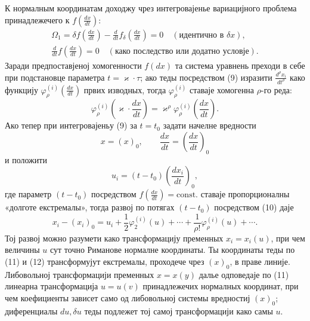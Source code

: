 ﻿\documentclass[11pt]{article}
\begin{document}
К нормалным координатам доходжу чрез интегровајенье вариацијного проблема принадлежечего к \(f\!\left(\frac{dx}{dt}\right)\):
\begin{equation}
\begin{gathered}
\Omega_1=\delta f\!\left(\frac{dx}{dt}\right)
-\frac{d}{dt}f_\delta\!\left(\frac{dx}{dt}\right)=0
\quad(\text{идентично в }\delta x),\\
\frac{d}{dt}f\!\left(\frac{dx}{dt}\right)=0
\quad(\text{како последство или додатно условје}).
\end{gathered}
\tag{9}
\end{equation}
Заради предпоставјеној хомогенности \(f(dx)\) та система уравнень преходи в себе при подстановце параметра \(t=\varkappa\cdot\tau\); ако теды посредством (9) изразити \(\frac{d^\rho x_i}{dt^\rho}\) како функцију \(\varphi_\rho^{(i)}\!\left(\frac{dx}{dt}\right)\) првих изводных, тогда \(\varphi_\rho^{(i)}\) ставаје хомогенна \(\rho\)-го реда:
\begin{equation}
\varphi_\rho^{(i)}\!\left(\varkappa\cdot\frac{dx}{dt}\right)
=\varkappa^\rho\varphi_\rho^{(i)}\!\left(\frac{dx}{dt}\right).
\tag{10}
\end{equation}
Ако тепер при интегровајеньу (9) за \(t=t_0\) задати начелне вредности
\[
x=(x)_0,\qquad \frac{dx}{dt}=\left(\frac{dx}{dt}\right)_0
\]
и положити
\begin{equation}
u_i=(t-t_0)\left(\frac{dx_i}{dt}\right)_0,
\tag{11}
\end{equation}
где параметр \((t-t_0)\) посредством \(f\!\left(\frac{dx}{dt}\right)=\mathrm{const.}\) ставаје пропорционалны «долготе екстремалы», тогда развој по потягах \((t-t_0)\) посредством (10) даје
\begin{equation}
x_i-(x_i)_0=u_i+\frac12\varphi_2^{(i)}(u)+\cdots+
\frac{1}{\rho!}\varphi_\rho^{(i)}(u)+\cdots .
\tag{12}
\end{equation}
Тој развој можно разумети како трансформацију пременных \(x_i=x_i(u)\), при чем величины \(u\) сут точно Риманове нормалне координаты. Ты координаты теды по (11) и (12) трансформујут екстремалы, проходече чрез \((x)_0\), в праве линије. Либовольној трансформацији пременных \(x=x(y)\) далье одповедаје по (11) линеарна трансформација \(u=u(v)\) принадлежечих нормалных координат, при чем коефициенты зависет само од либовольној системы вредностиј \((x)_0\); диференциалы \(du,\delta u\) теды подлежет тој самој трансформацији како самы \(u\).
\end{document}

